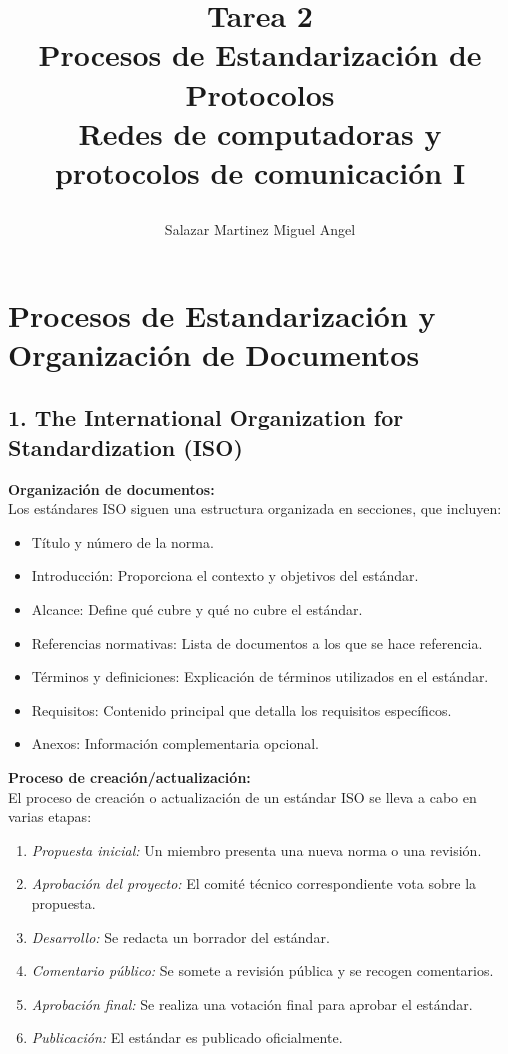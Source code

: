 \documentclass[12pt]{report}
\title{
	\begin{center}
		Tarea 2\\
		Procesos de Estandarización de Protocolos\\
		Redes de computadoras y protocolos de comunicación I
		
	\end{center}
}
\author{Salazar Martinez Miguel Angel}
\begin{document}
	\renewcommand{\arraystretch}{1.3}
	
	\maketitle

\section*{Procesos de Estandarización y Organización de Documentos}

\subsection*{1. The International Organization for Standardization (ISO)}

\textbf{Organización de documentos:} \\
Los estándares ISO siguen una estructura organizada en secciones, que incluyen:
\begin{itemize}
	\item Título y número de la norma.
	\item Introducción: Proporciona el contexto y objetivos del estándar.
	\item Alcance: Define qué cubre y qué no cubre el estándar.
	\item Referencias normativas: Lista de documentos a los que se hace referencia.
	\item Términos y definiciones: Explicación de términos utilizados en el estándar.
	\item Requisitos: Contenido principal que detalla los requisitos específicos.
	\item Anexos: Información complementaria opcional.
\end{itemize}

\textbf{Proceso de creación/actualización:} \\
El proceso de creación o actualización de un estándar ISO se lleva a cabo en varias etapas:
\begin{enumerate}
	\item \textit{Propuesta inicial:} Un miembro presenta una nueva norma o una revisión.
	\item \textit{Aprobación del proyecto:} El comité técnico correspondiente vota sobre la propuesta.
	\item \textit{Desarrollo:} Se redacta un borrador del estándar.
	\item \textit{Comentario público:} Se somete a revisión pública y se recogen comentarios.
	\item \textit{Aprobación final:} Se realiza una votación final para aprobar el estándar.
	\item \textit{Publicación:} El estándar es publicado oficialmente.
\end{enumerate}
\end{document}

